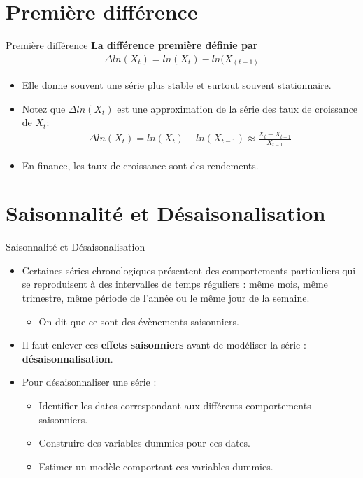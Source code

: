 \documentclass{beamer}
\begin{document}
\section{Première différence}
\frame{\tableofcontents[current]}

\begin{frame}{Première différence}
\textbf{La différence première définie par}
\begin{align*}
\Delta ln⁡(X_t) = ln(X_t) - ln(X_(t-1)
\end{align*}
\begin{itemize}
\item Elle donne souvent une série plus stable et surtout souvent stationnaire.
\item Notez que $\Delta ln⁡(X_t)$ est une approximation de la série des taux de croissance de $X_t$:
\begin{align*}
\Delta ln(X_t)=ln(X_t)-ln(X_{t-1}) \approx \frac{X_t-X_{t-1}}{X_{t-1}}
\end{align*}
\item En finance, les taux de croissance sont des rendements.
\end{itemize}
\end{frame}

\section{Saisonnalité et Désaisonalisation}
\frame{\tableofcontents[current]}

\begin{frame}{Saisonnalité et Désaisonalisation}
\begin{itemize}
\item Certaines séries chronologiques présentent des comportements particuliers qui se reproduisent à des intervalles de temps réguliers : même mois, même trimestre, même période de l’année ou le même jour de la semaine. 
\begin{itemize}
\item On dit que ce sont des évènements saisonniers.
\end{itemize}
\item Il faut enlever ces \textbf{effets saisonniers} avant de modéliser la série : \textbf{désaisonnalisation}.
\item Pour désaisonnaliser une série :
\begin{itemize}
\item Identifier les dates correspondant aux différents comportements saisonniers.
\item Construire des variables dummies pour ces dates.
\item Estimer un modèle comportant ces variables dummies.
\end{itemize}
\end{itemize}
\end{frame}
\end{document}
